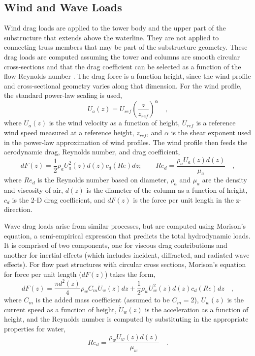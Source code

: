 \subsection{Wind and Wave Loads}
Wind drag loads are applied to the tower body and the upper part of the
substructure that extends above the waterline.  They are not applied to
connecting truss members that may be part of the substructure geometry.
These drag loads are computed assuming the tower and columns are smooth
circular cross-sections and that the drag coefficient can be selected as
a function of the flow Reynolds number \citep{Roshko}.  The drag force
is a function height, since the wind profile and cross-sectional geometry varies
along that dimension.  For the wind profile, the standard power-law
scaling is used,
\begin{equation}
  U_a(z) = U_{ref}\left(\frac{z}{z_{ref}}\right)^{\alpha}\quad,
\end{equation}
where $U_a(z)$ is the wind velocity as a function of height, $U_{ref}$ is a
reference wind speed measured at a reference height, $z_{ref}$, and
$\alpha$ is the shear exponent used in the power-law approximation of
wind profiles.  The wind profile then feeds the aerodynamic drag,
Reynolds number, and drag coefficient,
\begin{equation} \label{eqn:drag}
  dF(z) = \frac{1}{2} \rho_a U_a^2(z) d(z) c_d(Re) dz;\qquad
  Re_d = \frac{\rho_a U_a(z) d(z)}{\mu_a}\quad,
\end{equation}
where $Re_d$ is the Reynolds number based on diameter, $\rho_a$ and
$\mu_a$ are the density and viscosity of air, $d(z)$ is the diameter of
the column as a function of height, $c_d$ is the 2-D drag coefficient, and
$dF(z)$ is the force per unit length in the z-direction.

Wave drag loads arise from similar processes, but are computed using
Morison's equation, a semi-empirical expression that predicts the total
hydrodynamic loads.  It is comprised of two components, one for viscous
drag contributions and another for inertial effects (which includes
incident, diffracted, and radiated wave effects).  For flow past
structures with circular cross sections, Morison's equation for force
per unit length ($dF(z)$) takes the form,
\begin{equation} \label{eqn:morison}
  dF(z) = \frac{\pi d^2(z)}{4} \rho_w C_m \dot{U}_w(z)dz + \frac{1}{2} \rho_w U_w^2(z) d(z) c_d(Re)dz\quad,
\end{equation}
where $C_m$ is the added mass coefficient (assumed to be $C_m=2$),
$U_w(z)$ is the current speed as a function of height, $\dot{U}_w(z)$ is
the acceleration as a function of height, and the Reynolds number is
computed by substituting in the appropriate properties for water,
\begin{equation}
Re_d = \frac{\rho_w U_w(z) d(z)}{\mu_w}\quad.
\end{equation}

